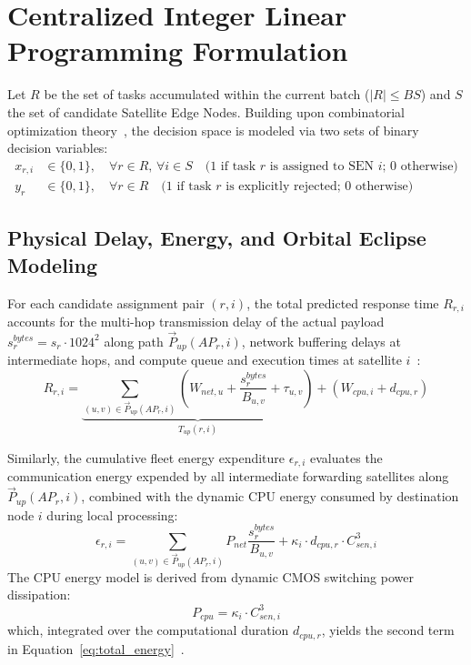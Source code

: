 \section{Centralized Integer Linear Programming Formulation}
\label{sec:mathematical_model}

Let $R$ be the set of tasks accumulated within the current batch ($|R| \le BS$) and $S$ the set of candidate Satellite Edge Nodes. 
Building upon combinatorial optimization theory~\cite{wolsey1998integer, boyd2004convex}, the decision space is modeled via two sets of binary decision variables:
\begin{align}
    x_{r,i} &\in \{0, 1\}, \quad \forall r \in R, \, \forall i \in S \quad \text{(1 if task $r$ is assigned to SEN $i$; 0 otherwise)} \\
    y_r &\in \{0, 1\}, \quad \forall r \in R \quad \text{(1 if task $r$ is explicitly rejected; 0 otherwise)}
\end{align}

\subsection{Physical Delay, Energy, and Orbital Eclipse Modeling}
\label{subsec:latency_energy_models}

For each candidate assignment pair $(r, i)$, the total predicted response time $R_{r,i}$ accounts for the multi-hop transmission delay of the actual payload $s_r^{bytes} = s_r \cdot 1024^2$ along path $\vec{P}_{up}(AP_r, i)$, network buffering delays at intermediate hops, and compute queue and execution times at satellite $i$~\cite{icdcs_satellite_2025}:
\begin{equation}
    R_{r,i} = \underbrace{\sum_{(u,v) \in \vec{P}_{up}(AP_r, i)} \left( W_{net,u} + \frac{s_r^{bytes}}{B_{u,v}} + \tau_{u,v} \right)}_{T_{up}(r,i)} + \left( W_{cpu,i} + d_{cpu,r} \right)
    \label{eq:total_latency}
\end{equation}

Similarly, the cumulative fleet energy expenditure $\epsilon_{r,i}$ evaluates the communication energy expended by all intermediate forwarding satellites along $\vec{P}_{up}(AP_r, i)$, combined with the dynamic CPU energy consumed by destination node $i$ during local processing:
\begin{equation}
    \epsilon_{r,i} = \sum_{(u,v) \in \vec{P}_{up}(AP_r, i)} P_{net} \frac{s_r^{bytes}}{B_{u,v}} + \kappa_i \cdot d_{cpu,r} \cdot C_{sen,i}^3
    \label{eq:total_energy}
\end{equation}
The CPU energy model is derived from dynamic CMOS switching power dissipation:
\begin{equation}
    P_{cpu} = \kappa_i \cdot C_{sen,i}^3
\end{equation}
which, integrated over the computational duration $d_{cpu,r}$, yields the second term in Equation~\eqref{eq:total_energy}~\cite{icdcs_satellite_2025}.

